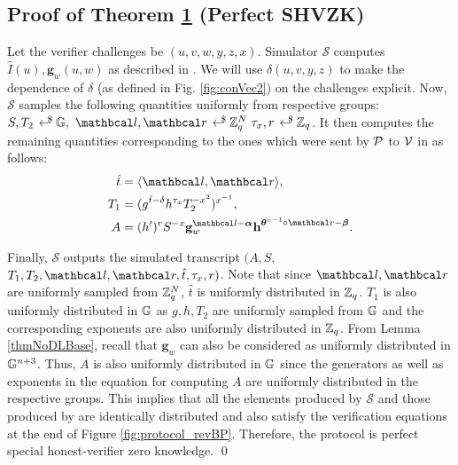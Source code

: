   \subsection{Proof of Theorem \hyperref[label:thm1]{1} (Perfect SHVZK)}
  \label{scnProofTheorem1}
  \vspace{-2pt}
  Let the verifier challenges be $(u, v, w, y, z, x)$. Simulator $\mathcal{S}$ computes $\hat{I}(u), \textbf{g}_w(u,w)$ as described in \protow. 
  We will use $\delta(u,v,y,z)$ to make the dependence of $\delta$ (as defined in Fig. \ref{fig:conVec2}) on the challenges explicit.
  Now, $\mathcal{S}$ samples the following quantities uniformly from respective groups: $S, T_2 \rgen \G, \ \lvec, \rvec \rgen \Z_q^N \ \tau_x, r \rgen \Z_q$.
  It then computes the remaining quantities corresponding to the ones which were sent by $\P$ to $\V$ in \proto as follows:
  \begin{align}
      \hat{t} &= \langle \lvec, \rvec \rangle,\\
      T_1 &= (g^{\hat{t} - \delta} h^{\tau_x} T_2^{-x^2})^{x^{-1}},\\
      A &= (h^{\prime})^r S^{-x} \textbf{g}_w^{\lvec - \vecnb{\alpha}} \textbf{h}^{\vecnb{\theta}^{\circ -1} \circ \rvec - \vecnb{\beta}}. \label{label:a}
  \end{align}
  
  Finally, $\mathcal{S}$ outputs the simulated transcript $(A, S,$ $T_1, T_2, \lvec, \rvec, \hat{t}, \tau_x, r)$. 
  Note that since $\lvec, \rvec$ are uniformly sampled from $\Z_q^N$, $\hat{t}$ is uniformly distributed in $\Z_q$. $T_1$ is also uniformly distributed in $\G$ as $g,h, T_2$ are uniformly sampled from $\G$ and the corresponding exponents are also uniformly distributed in $\Z_q$.
  From Lemma \ref{thmNoDLBase}, recall that $\textbf{g}_w$ can also be considered as uniformly distributed in $\G^{n+3}$. Thus, $A$ is also uniformly distributed in $\G$ since the generators as well as exponents in the equation for computing $A$ are uniformly distributed in the respective groups.
  This implies that all the elements produced by $\mathcal{S}$ and those produced by \proto are identically distributed and also satisfy the verification equations at the end of Figure \ref{fig:protocol_revBP}.
  Therefore, the protocol is perfect special honest-verifier zero knowledge. \hfill{\small \qed}
  
